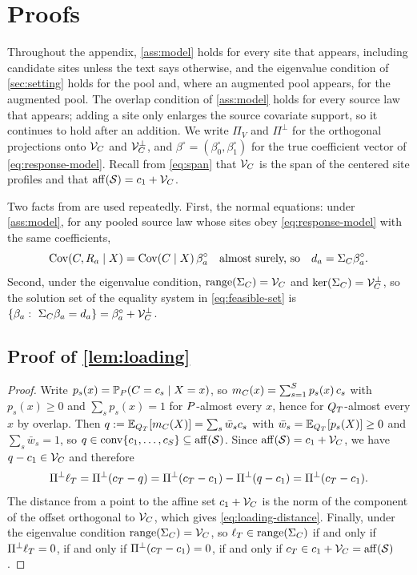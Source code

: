 \section{Proofs}
\label{app:proofs}

Throughout the appendix, \cref{ass:model} holds for every site that
appears, including candidate sites unless the text says otherwise, and
the eigenvalue condition of \cref{sec:setting} holds for the pool and,
where an augmented pool appears, for the augmented pool. The overlap
condition of \cref{ass:model} holds for every source law that appears;
adding a site only enlarges the source covariate support, so it
continues to hold after an addition. We write
$\Pi_V$ and $\Pi^\perp$ for the orthogonal projections onto $\mathcal V_C$ and
$\mathcal V_C^\perp$, and $\beta^\circ=(\beta_0^\circ,\beta_1^\circ)$ for the
true coefficient vector of \eqref{eq:response-model}. Recall from
\eqref{eq:span} that $\mathcal V_C$ is the span of the centered site profiles
and that $\operatorname{aff}(\mathcal S)=c_1+\mathcal V_C$.

Two facts from \citet{boyarsky2026} are used repeatedly. First, the
normal equations: under \cref{ass:model}, for any pooled source law
whose sites obey \eqref{eq:response-model} with the same coefficients,
\begin{equation}
  {\rm Cov}(C,R_{a}\mid X)={\rm Cov}(C\mid X)\,\beta_a^\circ
  \quad\text{almost surely, so}\quad
  d_{a}=\Sigma_C\beta_a^\circ.
  \label{eq:app-normal}
\end{equation}
Second, under the eigenvalue condition, $\operatorname{range}(\Sigma_C)=\mathcal V_C$ and
$\operatorname{ker}(\Sigma_C)=\mathcal V_C^\perp$, so the solution set of the equality
system in \eqref{eq:feasible-set} is
$\{\beta_a:\ \Sigma_C\beta_a=d_{a}\}
=\beta^\circ_a+\mathcal V_C^\perp$.

\subsection{Proof of \texorpdfstring{\cref{lem:loading}}{Lemma 1}}
\label{app:proof-loading}

\begin{proof}
Write $p_s(x)=\mathbb{P}_P(C=c_s\mid X=x)$, so
$m_C(x)=\sum_{s=1}^S p_s(x)\,c_s$ with $p_s(x)\geq0$ and
$\sum_s p_s(x)=1$ for $P$-almost every $x$, hence for $Q_T$-almost
every $x$ by overlap. Then
$q:=\mathbb{E}_{Q_T}[m_C(X)]=\sum_s \bar w_s c_s$ with $\bar w_s=\mathbb{E}_{Q_T}[p_s(X)]\geq0$
and $\sum_s\bar w_s=1$, so $q\in\operatorname{conv}\{c_1,\ldots,c_S\}\subseteq
\operatorname{aff}(\mathcal S)$. Since $\operatorname{aff}(\mathcal S)=c_1+\mathcal V_C$, we have
$q-c_1\in\mathcal V_C$ and therefore
\[
  \Pi^\perp\ell_T=\Pi^\perp(c_T-q)
  =\Pi^\perp(c_T-c_1)-\Pi^\perp(q-c_1)=\Pi^\perp(c_T-c_1).
\]
The distance from a point to the affine set $c_1+\mathcal V_C$ is the norm of
the component of the offset orthogonal to $\mathcal V_C$, which gives
\eqref{eq:loading-distance}. Finally, under the eigenvalue condition
$\operatorname{range}(\Sigma_C)=\mathcal V_C$, so $\ell_T\in\operatorname{range}(\Sigma_C)$ if and only if
$\Pi^\perp\ell_T=0$, if and only if $\Pi^\perp(c_T-c_1)=0$, if and only
if $c_T\in c_1+\mathcal V_C=\operatorname{aff}(\mathcal S)$.
\end{proof}

